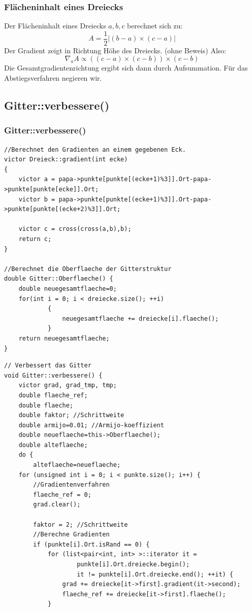 \documentclass{beamer}
\begin{document}
\begin{frame}
\frametitle{Flächeninhalt eines Dreiecks}
Der Flächeninhalt eines Dreiecks $a, b, c$ berechnet sich zu:
\[
	A=\frac 1 2 |(b-a)\times(c-a)|
\]
Der Gradient zeigt in Richtung Höhe des Dreiecks. (ohne Beweis) Also:
\[
	\nabla_a A\varpropto ((c-a) \times (c-b)) \times (c-b)
\]
Die Gesamtgradientenrichtung ergibt sich dann durch Aufsummation. Für das Abstiegsverfahren negieren wir.
\end{frame}
\subsection{Gitter::verbessere()}
\begin{frame}[fragile]
\frametitle{Gitter::verbessere()}
\begin{lstlisting}
//Berechnet den Gradienten an einem gegebenen Eck.
victor Dreieck::gradient(int ecke)
{
    victor a = papa->punkte[punkte[(ecke+1)%3]].Ort-papa->punkte[punkte[ecke]].Ort;
    victor b = papa->punkte[punkte[(ecke+1)%3]].Ort-papa->punkte[punkte[(ecke+2)%3]].Ort;

    victor c = cross(cross(a,b),b);
    return c;
}

//Berechnet die Oberflaeche der Gitterstruktur
double Gitter::Oberflaeche() {
	double neuegesamtflaeche=0;
	for(int i = 0; i < dreiecke.size(); ++i)
	        {
	            neuegesamtflaeche += dreiecke[i].flaeche();
	        }
	return neuegesamtflaeche;
}
\end{lstlisting}
\end{frame}

\begin{frame}[fragile]
\begin{lstlisting}
// Verbessert das Gitter
void Gitter::verbessere() {
	victor grad, grad_tmp, tmp;
	double flaeche_ref;
	double flaeche;
	double faktor; //Schrittweite
	double armijo=0.01; //Armijo-koeffizient
	double neueflaeche=this->Oberflaeche();
	double alteflaeche;
	do {
		alteflaeche=neueflaeche;
	for (unsigned int i = 0; i < punkte.size(); i++) {
		//Gradientenverfahren
		flaeche_ref = 0;
		grad.clear();

		faktor = 2; //Schrittweite
		//Berechne Gradienten
		if (punkte[i].Ort.isRand == 0) {
			for (list<pair<int, int> >::iterator it =
					punkte[i].Ort.dreiecke.begin();
					it != punkte[i].Ort.dreiecke.end(); ++it) {
				grad += dreiecke[it->first].gradient(it->second);
				flaeche_ref += dreiecke[it->first].flaeche();
			}
\end{lstlisting}
\end{frame}
\end{document}
